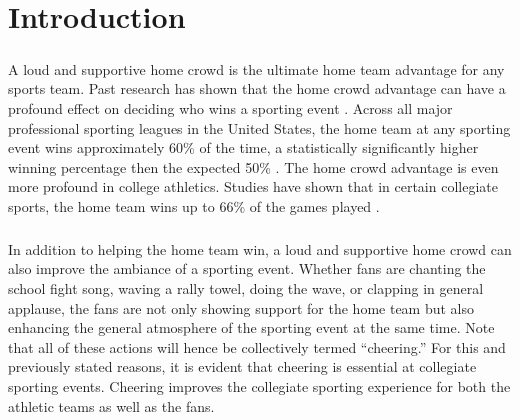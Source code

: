 \documentclass[oneside,12pt]{report}
\def\prefacesection#1{
\chapter*{#1}
\addcontentsline{toc}{chapter}{#1}
}
\begin{document}
\listoffigures

\listoftables



\renewcommand{\thefootnote}{\arabic{footnote}}
\setcounter{footnote}{0}

\prefacesection{Introduction}
\paragraph{}
A loud and supportive home crowd is the ultimate home team advantage for any sports team. Past research has shown that the home crowd advantage can have a profound effect on deciding who wins a sporting event \cite{Jamieson_2010}. Across all major professional sporting leagues in the United States, the home team at any sporting event wins approximately 60\% of the time, a statistically significantly higher winning percentage then the expected 50\% \cite{Jamieson_2010}. The home crowd advantage is even more profound in college athletics. Studies have shown that in certain collegiate sports, the home team wins up to 66\% of the games played \cite{Snyder_1985}.

\paragraph{}
In addition to helping the home team win, a loud and supportive home crowd can also improve the ambiance of a sporting event. Whether fans are chanting the school fight song, waving a rally towel, doing the wave, or clapping in general applause, the fans are not only showing support for the home team but also enhancing the general atmosphere of the sporting event at the same time. Note that all of these actions will hence be collectively termed ``cheering.'' For this and previously stated reasons, it is evident that cheering is essential at collegiate sporting events. Cheering improves the collegiate sporting experience for both the athletic teams as well as the fans. 
\end{document}
